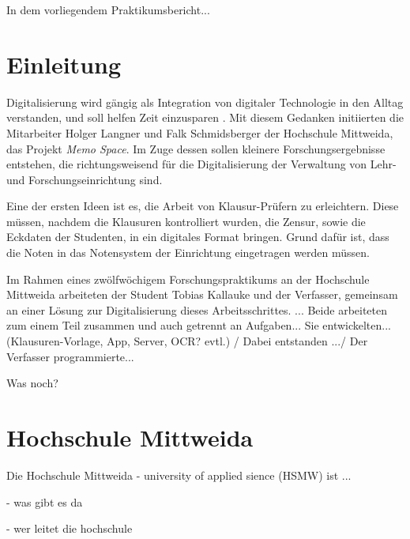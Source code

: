 \documentclass[nomenclature, 150]{HSMW-Thesis}
\begin{document}
\begin{Referat}
In dem vorliegendem Praktikumsbericht...

\end{Referat}


\Hauptteil


\chapter{Einleitung}
	Digitalisierung wird gängig als Integration von digitaler Technologie in den Alltag verstanden, und soll helfen Zeit einzusparen \cite{digital}. Mit diesem Gedanken initiierten die Mitarbeiter Holger Langner und Falk Schmidsberger der Hochschule Mittweida, das Projekt \textit{Memo Space}. Im Zuge dessen sollen kleinere Forschungsergebnisse entstehen, die richtungsweisend für die Digitalisierung der Verwaltung von Lehr- und Forschungseinrichtung sind.

	Eine der ersten Ideen ist es, die Arbeit von Klausur-Prüfern zu erleichtern. Diese müssen, nachdem die Klausuren kontrolliert wurden, die Zensur, sowie die Eckdaten der Studenten, in ein digitales Format bringen. Grund dafür ist, dass die Noten in das Notensystem der Einrichtung eingetragen werden müssen. 

	Im Rahmen eines zwölfwöchigem Forschungspraktikums an der Hochschule Mittweida arbeiteten der Student Tobias Kallauke und der Verfasser, gemeinsam an einer Lösung zur Digitalisierung dieses Arbeitsschrittes. ... Beide arbeiteten zum einem Teil zusammen und auch getrennt an Aufgaben... Sie entwickelten... (Klausuren-Vorlage, App, Server, OCR? evtl.) / Dabei entstanden .../ Der Verfasser programmierte...
	
	Was noch? 

\chapter{Hochschule Mittweida}
	Die Hochschule Mittweida - university of applied sience (HSMW)  ist ...
	
	- was gibt es da
	
	- wer leitet die hochschule
	
\end{document}
